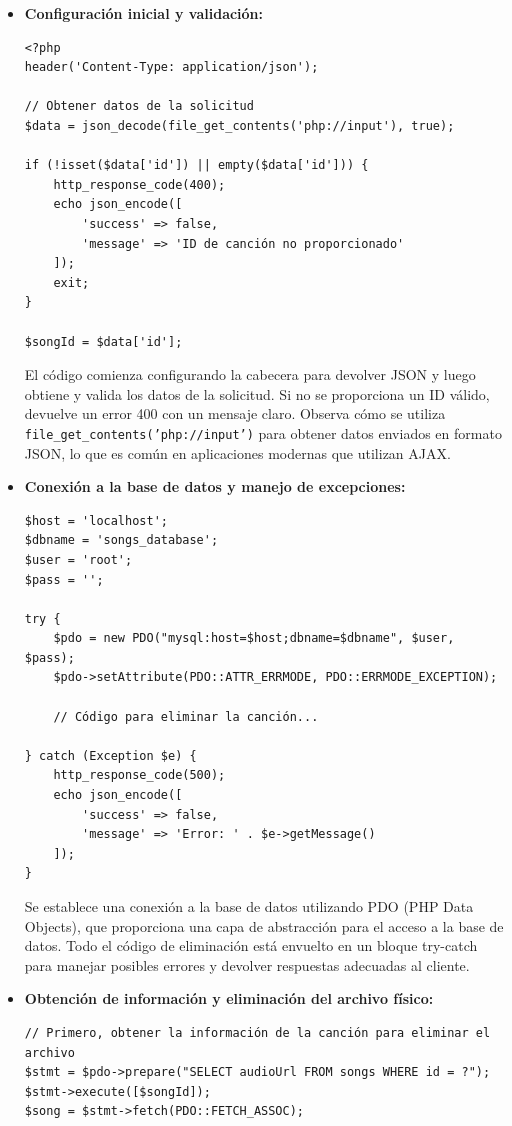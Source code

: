 \documentclass[a4paper,12pt]{article}
\begin{document}
\begin{itemize}
    \item \textbf{Configuración inicial y validación:}
    \begin{verbatim}
<?php
header('Content-Type: application/json');

// Obtener datos de la solicitud
$data = json_decode(file_get_contents('php://input'), true);

if (!isset($data['id']) || empty($data['id'])) {
    http_response_code(400);
    echo json_encode([
        'success' => false,
        'message' => 'ID de canción no proporcionado'
    ]);
    exit;
}

$songId = $data['id'];
    \end{verbatim}
    El código comienza configurando la cabecera para devolver JSON y luego obtiene y valida los datos de la solicitud. Si no se proporciona un ID válido, devuelve un error 400 con un mensaje claro. Observa cómo se utiliza \texttt{file\_get\_contents('php://input')} para obtener datos enviados en formato JSON, lo que es común en aplicaciones modernas que utilizan AJAX.
    
    \item \textbf{Conexión a la base de datos y manejo de excepciones:}
    \begin{verbatim}
$host = 'localhost';
$dbname = 'songs_database';
$user = 'root';
$pass = '';

try {
    $pdo = new PDO("mysql:host=$host;dbname=$dbname", $user, $pass);
    $pdo->setAttribute(PDO::ATTR_ERRMODE, PDO::ERRMODE_EXCEPTION);
    
    // Código para eliminar la canción...
    
} catch (Exception $e) {
    http_response_code(500);
    echo json_encode([
        'success' => false,
        'message' => 'Error: ' . $e->getMessage()
    ]);
}
    \end{verbatim}
    Se establece una conexión a la base de datos utilizando PDO (PHP Data Objects), que proporciona una capa de abstracción para el acceso a la base de datos. Todo el código de eliminación está envuelto en un bloque try-catch para manejar posibles errores y devolver respuestas adecuadas al cliente.
    
    \item \textbf{Obtención de información y eliminación del archivo físico:}
    \begin{verbatim}
// Primero, obtener la información de la canción para eliminar el archivo
$stmt = $pdo->prepare("SELECT audioUrl FROM songs WHERE id = ?");
$stmt->execute([$songId]);
$song = $stmt->fetch(PDO::FETCH_ASSOC);


\end{verbatim}
\end{itemize}
\end{document}

